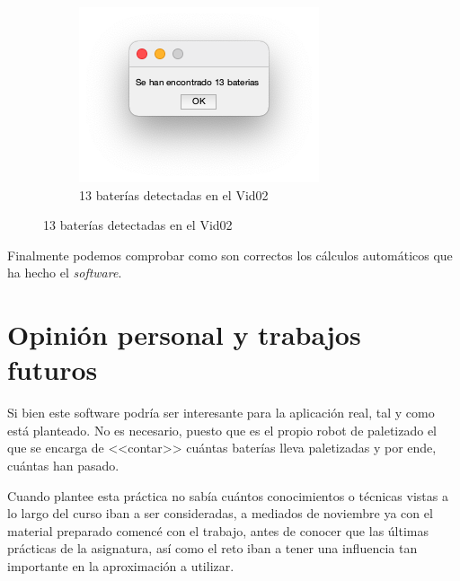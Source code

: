 \documentclass[11pt]{memoir}
\begin{document}
\begin{center}
\begin{figure}[H]
\begin{subfigure}{0.3\textwidth}
    \includegraphics[width=\textwidth]{img/S2}
    \caption{13 baterías detectadas en el Vid02}
    \label{fig:salida3}
\end{subfigure}
\end{figure}
\end{center}

Finalmente podemos comprobar como son correctos los cálculos automáticos que ha hecho el \textit{software}.

\section{Opinión personal y trabajos futuros}
Si bien este software podría ser interesante para la aplicación real, tal y como está planteado. No es necesario, puesto que es el propio robot de paletizado el que se encarga de <<contar>> cuántas baterías lleva paletizadas y por ende, cuántas han pasado. 

Cuando plantee esta práctica no sabía cuántos conocimientos o técnicas vistas a lo largo del curso iban a ser consideradas, a mediados de noviembre ya con el material preparado comencé con el trabajo, antes de conocer que las últimas prácticas de la asignatura, así como el reto iban a tener una influencia tan importante en la aproximación a utilizar.
\end{document}
